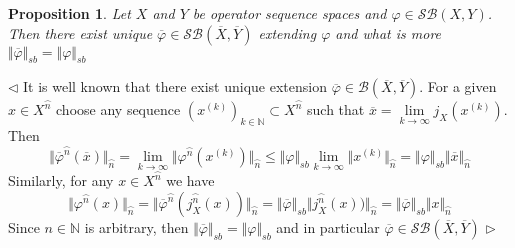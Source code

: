 \documentclass[12pt]{article}
\newtheorem{proposition}[theorem]{Proposition}
\newenvironment{proof}{\par $\triangleleft$}{$\triangleright$}
\begin{document}
\begin{proposition}\label{PrExtLinOpByCont} Let $X$ and $Y$ be operator sequence spaces and $\varphi\in\mathcal{SB}(X,Y)$. Then there exist unique $\overline{\varphi}\in\mathcal{SB}(\overline{X},\overline{Y})$ extending $\varphi$ and what is more $\Vert \overline{\varphi}\Vert_{sb}=\Vert \varphi\Vert_{sb}$
\end{proposition}
\begin{proof}
It is well known that there exist unique extension $\overline{\varphi}\in\mathcal{B}(\overline{X},\overline{Y})$. For a given $x\in X^{\wideparen{n}}$ choose any sequence $(x^{(k)})_{k\in\mathbb{N}}\subset X^{\wideparen{n}}$ such that $\overline{x}=\lim\limits_{k\to\infty} j_X(x^{(k)})$. Then
$$
\Vert\overline{\varphi}^{\wideparen{n}}(\overline{x})\Vert_{\wideparen{n}}
=\lim\limits_{k\to\infty}\Vert \varphi^{\wideparen{n}}(x^{(k)})\Vert_{\wideparen{n}}
\leq\Vert \varphi\Vert_{sb}\lim\limits_{k\to\infty}\Vert x^{(k)}\Vert_{\wideparen{n}}
=\Vert \varphi\Vert_{sb}\Vert \overline{x}\Vert_{\wideparen{n}}
$$
Similarly, for any $x\in X^{\wideparen{n}}$ we have
$$
\Vert \varphi^{\wideparen{n}}(x)\Vert_{\wideparen{n}}
=\Vert\overline{\varphi}^{\wideparen{n}}(j_X^{\wideparen{n}}(x))\Vert_{\wideparen{n}}
=\Vert\overline{\varphi}\Vert_{sb}\Vert j_X^{\wideparen{n}}(x))\Vert_{\wideparen{n}}
=\Vert\overline{\varphi}\Vert_{sb}\Vert x\Vert_{\wideparen{n}}
$$
Since $n\in\mathbb{N}$ is arbitrary, then $\Vert \overline{\varphi}\Vert_{sb}=\Vert \varphi\Vert_{sb}$ and in particular $\overline{\varphi}\in\mathcal{SB}(\overline{X},\overline{Y})$
\end{proof}
\end{document}
